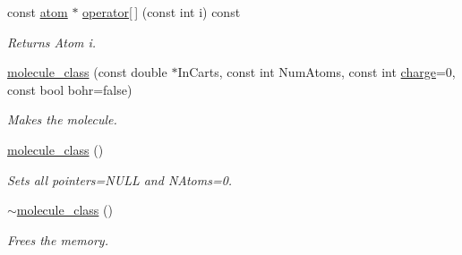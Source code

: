 \begin{DoxyCompactItemize}
const \hyperlink{classJKBuilder_1_1atom}{atom} $\ast$ \hyperlink{classJKBuilder_1_1molecule__class_a8a54a3b159b0eb733c877569b32f13e3}{operator\mbox{[}$\,$\mbox{]}} (const int i) const 
\begin{DoxyCompactList}\small\item\em Returns Atom i. \item\end{DoxyCompactList}\item 
\hyperlink{classJKBuilder_1_1molecule__class_a227b81bd92795b9926c71e77fa2e3d94}{molecule\_\-class} (const double $\ast$InCarts, const int NumAtoms, const int \hyperlink{classJKBuilder_1_1molecule__class_ae8b866d74c9f0b8464b1aee9788c04eb}{charge}=0, const bool bohr=false)
\begin{DoxyCompactList}\small\item\em Makes the molecule. \item\end{DoxyCompactList}\item 
\hyperlink{classJKBuilder_1_1molecule__class_a60295ae66e9fad98bd3feaa08a443d6d}{molecule\_\-class} ()
\begin{DoxyCompactList}\small\item\em Sets all pointers=NULL and NAtoms=0. \item\end{DoxyCompactList}\item 
\hyperlink{classJKBuilder_1_1molecule__class_ae8b7f222e2b1b67f0b5d078456e6b6bc}{$\sim$molecule\_\-class} ()
\begin{DoxyCompactList}\small\item\em Frees the memory. \item\end{DoxyCompactList}\end{DoxyCompactItemize}
